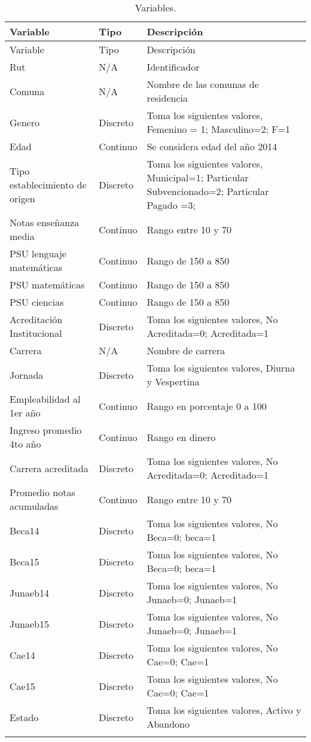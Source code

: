 \begin{longtable}{| p{3cm}| p{2cm} | p{7cm} |}
			\hline
			Variable & Tipo & Descripción \\
			\hline \hline
			\endfirsthead
			
			\hline
            Variable & Tipo & Descripción \\
            \hline \hline
            \endhead
            Rut & N/A & Identificador	\\ \hline			
			Comuna & N/A & Nombre de las comunas de residencia\\ \hline
			Genero & Discreto & Toma los siguientes valores, Femenino = 1; Masculino=2; F=1\\ \hline
			Edad & Continuo & Se considera edad del año 2014\\ \hline
			Tipo establecimiento de origen & Discreto & Toma los siguientes valores, Municipal=1; Particular Subvencionado=2; Particular Pagado =3;\\ \hline
			Notas enseñanza media & Continuo & Rango entre 10 y 70\\ \hline
			PSU lenguaje matemáticas & Continuo & Rango de 150 a 850\\ \hline
			PSU matemáticas & Continuo & Rango de 150 a 850\\ \hline
			PSU ciencias & Continuo & Rango de 150 a 850\\ \hline				
			Acreditación Institucional & Discreto & Toma los siguientes valores,  No Acreditada=0; Acreditada=1\\ \hline
			Carrera & N/A & Nombre de carrera\\ \hline
			Jornada & Discreto & Toma los siguientes valores,  Diurna y Vespertina\\ \hline
			Empleabilidad al 1er año & Continuo & Rango en porcentaje 0 a 100\\ \hline
			Ingreso promedio 4to año & Continuo & Rango en dinero\\ \hline
			Carrera acreditada & Discreto & Toma los siguientes valores,  No Acreditada=0; Acreditado=1\\ \hline 
			Promedio notas acumuladas & Continuo & Rango entre 10 y 70 \\ \hline
			Beca14 & Discreto & Toma los siguientes valores,  No Beca=0; beca=1\\ \hline
			Beca15 & Discreto & Toma los siguientes valores,  No Beca=0; beca=1\\ \hline
			Junaeb14 & Discreto & Toma los siguientes valores,  No Junaeb=0; Junaeb=1\\ \hline
			Junaeb15 & Discreto & Toma los siguientes valores,  No Junaeb=0; Junaeb=1\\ \hline
			Cae14 & Discreto  & Toma los siguientes valores,  No Cae=0; Cae=1 \\ \hline
			Cae15 & Discreto & Toma los siguientes valores,  No Cae=0; Cae=1\\ \hline
			Estado & Discreto & Toma los siguientes valores,  Activo y Abandono\\ \hline
			 \hline
		\caption{Variables.}
		\label{tabla:variablesdiurna}
\end{longtable}	



